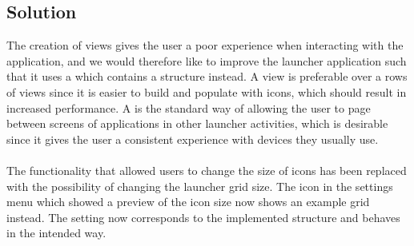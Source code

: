 \subsection{Solution}
\label{sub:reengineering_of_application_grid_solution}
The creation of  views gives the user a poor experience when interacting with the application, and we would therefore like to improve the launcher application such that it uses a  which contains a  structure instead. A  view is preferable over a rows of  views since it is easier to build and populate with icons, which should result in increased performance. A  is the standard way of allowing the user to page between screens of applications in other launcher activities, which is desirable since it gives the user a consistent experience with devices they usually use. 
\\\\
The functionality that allowed users to change the size of icons has been replaced with the possibility of changing the launcher grid size. The icon in the settings menu which showed a preview of the icon size now shows an example grid instead. The setting now corresponds to the implemented structure and behaves in the intended way.